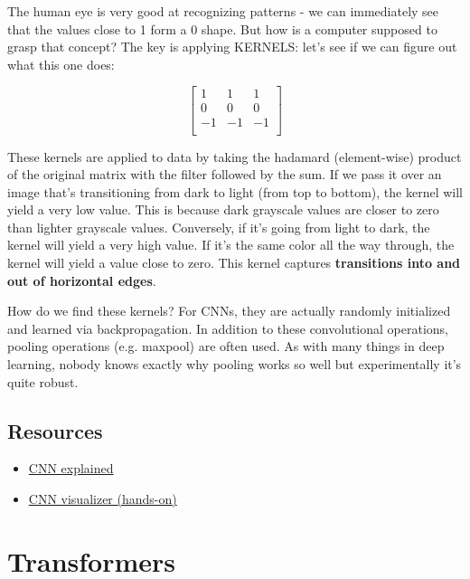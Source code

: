 \documentclass[12pt]{article}
\begin{document}
The human eye is very good at recognizing patterns - we can immediately see that the values close to 1 form a 0 shape. But how is a computer supposed to grasp that concept? The key is applying KERNELS: let's see if we can figure out what this one does:

\[
\begin{bmatrix}
1 & 1 & 1 \\
0 & 0 & 0 \\
-1 & -1 & -1 \\
\end{bmatrix}
\]

These kernels are applied to data by taking the hadamard (element-wise) product of the original matrix with the filter followed by the sum. If we pass it over an image that's transitioning from dark to light (from top to bottom), the kernel will yield a very low value. This is because dark grayscale values are closer to zero than lighter grayscale values. Conversely, if it's going from light to dark, the kernel will yield a very high value. If it's the same color all the way through, the kernel will yield a value close to zero. This kernel captures \textbf{transitions into and out of horizontal edges}. 

How do we find these kernels? For CNNs, they are actually randomly initialized and learned via backpropagation. In addition to these convolutional operations, pooling operations (e.g. maxpool) are often used. As with many things in deep learning, nobody knows exactly why pooling works so well but experimentally it's quite robust. 


\subsection{Resources}
\begin{itemize}
  \item \href{https://towardsdatascience.com/convolutional-neural-networks-explained-9cc5188c4939/}{CNN explained}  
  \item \href{https://poloclub.github.io/cnn-explainer/}{CNN visualizer (hands-on)}
\end{itemize}


\section{Transformers}
\end{document}
